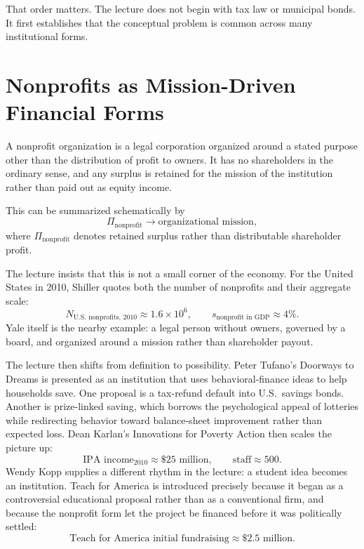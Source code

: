 That order matters. The lecture does not begin with tax law or municipal bonds. It first establishes that the conceptual problem is common across many institutional forms.

\section{Nonprofits as Mission-Driven Financial Forms}

\begin{definition}
A nonprofit organization is a legal corporation organized around a stated purpose other than the distribution of profit to owners. It has no shareholders in the ordinary sense, and any surplus is retained for the mission of the institution rather than paid out as equity income.
\end{definition}

This can be summarized schematically by
\begin{equation}
\Pi_{\text{nonprofit}} \longrightarrow \text{organizational mission},
\end{equation}
where \(\Pi_{\text{nonprofit}}\) denotes retained surplus rather than distributable shareholder profit.

The lecture insists that this is not a small corner of the economy. For the United States in 2010, Shiller quotes both the number of nonprofits and their aggregate scale:
\begin{equation}
N_{\text{U.S. nonprofits, 2010}} \approx 1.6\times 10^6,
\qquad
s_{\text{nonprofit in GDP}} \approx 4\%.
\end{equation}
Yale itself is the nearby example: a legal person without owners, governed by a board, and organized around a mission rather than shareholder payout.

The lecture then shifts from definition to possibility. Peter Tufano's Doorways to Dreams is presented as an institution that uses behavioral-finance ideas to help households save. One proposal is a tax-refund default into U.S.\ savings bonds. Another is prize-linked saving, which borrows the psychological appeal of lotteries while redirecting behavior toward balance-sheet improvement rather than expected loss. Dean Karlan's Innovations for Poverty Action then scales the picture up:
\begin{equation}
\text{IPA income}_{2010} \approx \$25\text{ million},
\qquad
\text{staff} \approx 500.
\end{equation}
Wendy Kopp supplies a different rhythm in the lecture: a student idea becomes an institution. Teach for America is introduced precisely because it began as a controversial educational proposal rather than as a conventional firm, and because the nonprofit form let the project be financed before it was politically settled:
\begin{equation}
\text{Teach for America initial fundraising} \approx \$2.5\text{ million}.
\end{equation}

